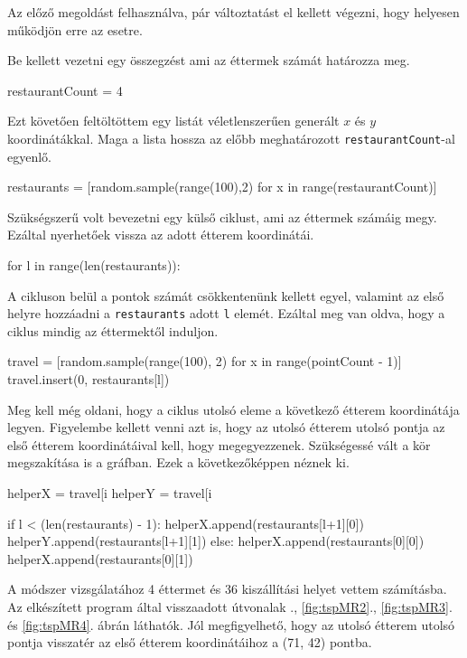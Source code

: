 
Az előző megoldást felhasználva, pár változtatást el kellett végezni, hogy helyesen működjön erre az esetre.

Be kellett vezetni egy összegzést ami az éttermek számát határozza meg.\cite{Python}
\begin{python}
restaurantCount = 4
\end{python}
Ezt követően feltöltöttem egy listát véletlenszerűen generált $x$ és $y$ koordinátákkal. Maga a lista hossza az előbb meghatározott \texttt{restaurantCount}-al egyenlő.
\begin{python}
restaurants = [random.sample(range(100),2)
               for x in range(restaurantCount)] 
\end{python}
Szükségszerű volt bevezetni egy külső ciklust, ami az éttermek számáig megy. Ezáltal nyerhetőek vissza az adott étterem koordinátái.
\begin{python}
for l in range(len(restaurants)):
\end{python}
A cikluson belül a pontok számát csökkentenünk kellett egyel, valamint az első helyre hozzáadni a \texttt{restaurants} adott \texttt{l} elemét. Ezáltal meg van oldva, hogy a ciklus mindig az éttermektől induljon.

\begin{python}
travel = [random.sample(range(100), 2) for x in range(pointCount - 1)]
travel.insert(0, restaurants[l])
\end{python}

Meg kell még oldani, hogy a ciklus utolsó eleme a következő étterem koordinátája legyen. Figyelembe kellett venni azt is, hogy az utolsó étterem utolsó pontja az első étterem koordinátáival kell, hogy megegyezzenek. Szükségessé vált a kör megszakítása is a gráfban. 
Ezek a következőképpen néznek ki. 
\begin{python}
helperX = travel[i %
helperY = travel[i %

if l < (len(restaurants) - 1):
	helperX.append(restaurants[l+1][0])
	helperY.append(restaurants[l+1][1])
else:
	helperX.append(restaurants[0][0])
	helperX.append(restaurants[0][1])
\end{python}


A módszer vizsgálatához 4 éttermet és 36 kiszállítási helyet vettem számításba.
Az elkészített program által visszaadott útvonalak ., \ref{fig:tspMR2}., \ref{fig:tspMR3}.  és \ref{fig:tspMR4}. ábrán láthatók.
Jól megfigyelhető, hogy az utolsó étterem utolsó pontja visszatér az első étterem koordinátáihoz a (71, 42) pontba.

